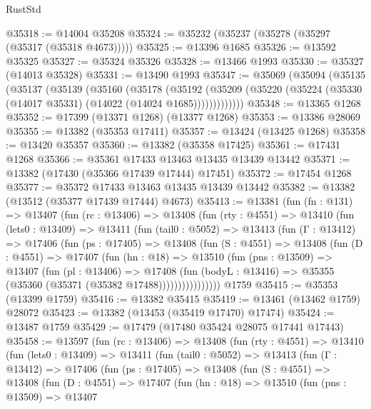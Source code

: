 \begin{lexlean}{RustStd}
\begin{coremodule}
@35318 := @14004 @35208
@35324 := @35232 (@35237 (@35278 (@35297 (@35317 (@35318 @4673)))))
@35325 := @13396 @1685
@35326 := @13592 @35325
@35327 := @35324 @35326
@35328 := @13466 @1993
@35330 := @35327 (@14013 @35328)
@35331 := @13490 @1993
@35347 := @35069
    (@35094
      (@35135
        (@35137
          (@35139
            (@35160
              (@35178
                (@35192
                  (@35209 (@35220 (@35224 (@35330 (@14017 @35331) (@14022 (@14024 @1685)))))))))))))
@35348 := @13365 @1268
@35352 := @17399 (@13371 @1268) (@13377 @1268)
@35353 := @13386 @28069
@35355 := @13382 (@35353 @17411)
@35357 := @13424 (@13425 @1268)
@35358 := @13420 @35357
@35360 := @13382 (@35358 @17425)
@35361 := @17431 @1268
@35366 := @35361 @17433 @13463 @13435 @13439 @13442
@35371 := @13382 (@17430 (@35366 @17439 @17444) @17451)
@35372 := @17454 @1268
@35377 := @35372 @17433 @13463 @13435 @13439 @13442
@35382 := @13382 (@13512 (@35377 @17439 @17444) @4673)
@35413 := @13381
    (fun (fn : @131) =>
    @13407
      (fun (rc : @13406) =>
      @13408
        (fun (rty : @4551) =>
        @13410
          (fun (lets0 : @13409) =>
          @13411
            (fun (tail0 : @5052) =>
            @13413
              (fun (Γ : @13412) =>
              @17406
                (fun (ps : @17405) =>
                @13408
                  (fun (S : @4551) =>
                  @13408
                    (fun (D : @4551) =>
                    @17407
                      (fun (hn : @18) =>
                      @13510
                        (fun (pns : @13509) =>
                        @13407
                          (fun (pl : @13406) =>
                          @17408
                            (fun (bodyL : @13416) =>
                            @35355 (@35360 (@35371 (@35382 @17488))))))))))))))))
    @1759
@35415 := @35353 (@13399 @1759)
@35416 := @13382 @35415
@35419 := @13461 (@13462 @1759) @28072
@35423 := @13382 (@13453 (@35419 @17470) @17474)
@35424 := @13487 @1759
@35429 := @17479 (@17480 @35424 @28075 @17441 @17443)
@35458 := @13597
    (fun (rc : @13406) =>
    @13408
      (fun (rty : @4551) =>
      @13410
        (fun (lets0 : @13409) =>
        @13411
          (fun (tail0 : @5052) =>
          @13413
            (fun (Γ : @13412) =>
            @17406
              (fun (ps : @17405) =>
              @13408
                (fun (S : @4551) =>
                @13408
                  (fun (D : @4551) =>
                  @17407
                    (fun (hn : @18) =>
                    @13510
                      (fun (pns : @13509) =>
                      @13407

\end{coremodule}
\end{lexlean}
